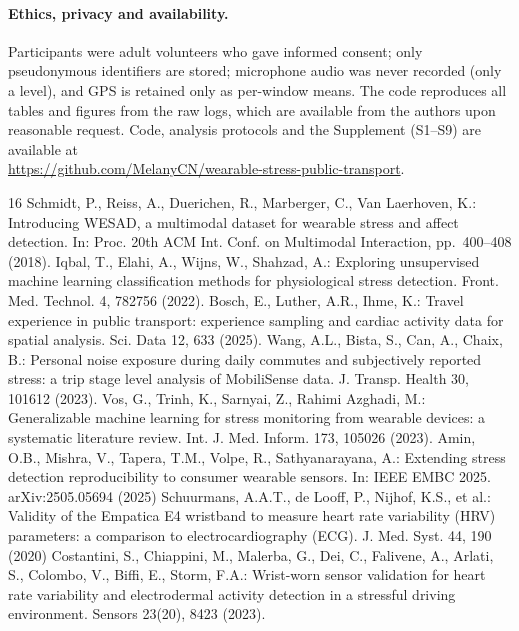 \documentclass[runningheads]{llncs}
\begin{document}
\paragraph{Ethics, privacy and availability.} Participants were adult volunteers who gave informed consent; only pseudonymous identifiers are stored; microphone audio was never recorded (only a level), and GPS is retained only as per-window means. The code reproduces all tables and figures from the raw logs, which are available from the authors upon reasonable request. Code, analysis protocols and the Supplement (S1--S9) are available at\\
\url{https://github.com/MelanyCN/wearable-stress-public-transport}.

\begin{thebibliography}{16}
 Schmidt, P., Reiss, A., Duerichen, R., Marberger, C., Van Laerhoven, K.: Introducing WESAD, a multimodal dataset for wearable stress and affect detection. In: Proc. 20th ACM Int. Conf. on Multimodal Interaction, pp.~400--408 (2018). 
 Iqbal, T., Elahi, A., Wijns, W., Shahzad, A.: Exploring unsupervised machine learning classification methods for physiological stress detection. Front. Med. Technol. 4, 782756 (2022). 
 Bosch, E., Luther, A.R., Ihme, K.: Travel experience in public transport: experience sampling and cardiac activity data for spatial analysis. Sci. Data 12, 633 (2025). 
 Wang, A.L., Bista, S., Can, A., Chaix, B.: Personal noise exposure during daily commutes and subjectively reported stress: a trip stage level analysis of MobiliSense data. J. Transp. Health 30, 101612 (2023). 
 Vos, G., Trinh, K., Sarnyai, Z., Rahimi Azghadi, M.: Generalizable machine learning for stress monitoring from wearable devices: a systematic literature review. Int. J. Med. Inform. 173, 105026 (2023). 
 Amin, O.B., Mishra, V., Tapera, T.M., Volpe, R., Sathyanarayana, A.: Extending stress detection reproducibility to consumer wearable sensors. In: IEEE EMBC 2025. arXiv:2505.05694 (2025)
 Schuurmans, A.A.T., de Looff, P., Nijhof, K.S., et al.: Validity of the Empatica E4 wristband to measure heart rate variability (HRV) parameters: a comparison to electrocardiography (ECG). J. Med. Syst. 44, 190 (2020)
 Costantini, S., Chiappini, M., Malerba, G., Dei, C., Falivene, A., Arlati, S., Colombo, V., Biffi, E., Storm, F.A.: Wrist-worn sensor validation for heart rate variability and electrodermal activity detection in a stressful driving environment. Sensors 23(20), 8423 (2023). 

\end{thebibliography}
\end{document}
